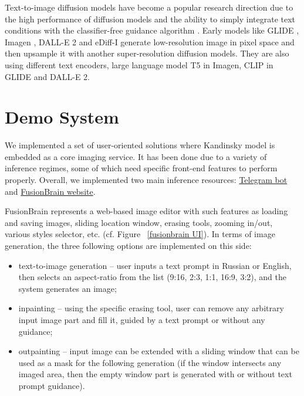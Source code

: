 \documentclass[11pt]{article}
\begin{document}
Text-to-image diffusion models have become a popular research direction  due to the high performance of diffusion models and the ability to simply integrate text conditions with the classifier-free guidance algorithm \cite{ho2021classifierfree}. Early models like GLIDE \cite{DBLP:conf/icml/NicholDRSMMSC22}, Imagen \cite{saharia2022photorealistic}, DALL-E 2 \cite{ramesh2022hierarchical} and eDiff-I \cite{balaji2023ediffi} generate low-resolution image in pixel space and then upsample it with another super-resolution diffusion models. They are also using different text encoders, large language model T5 \cite{raffel2020exploring} in Imagen, CLIP \cite{DBLP:conf/icml/RadfordKHRGASAM21} in GLIDE and DALL-E 2.



\section {Demo System}
We implemented a set of user-oriented solutions where Kandinsky model is embedded as a core imaging service. It has been done due to a variety of inference regimes, some of which need specific front-end features to perform properly. Overall, we implemented two main inference resources: \href{https://t.me/kandinsky21_bot}{Telegram bot} and \href{https://editor.fusionbrain.ai}{FusionBrain website}.



FusionBrain represents a web-based image editor with such features as loading and saving images, sliding location window, erasing tools, zooming in/out, various styles selector, etc. (cf. Figure ~\ref{fusionbrain UI}). In terms of image generation, the three following  options are implemented on this side:
\begin{itemize}
    \item text-to-image generation -- user inputs a text prompt in Russian or English, then selects an aspect-ratio from the list (9:16, 2:3, 1:1, 16:9, 3:2), and the system generates an image;
    \item inpainting -- using the specific erasing tool, user can remove any arbitrary input image part and fill it, guided by a text prompt or without any guidance;
    \item outpainting -- input image can be extended with a sliding window that can be used as a mask for the following generation (if the window intersects any imaged area, then the empty window part is generated with or without text prompt guidance).
\end{itemize}
\end{document}
